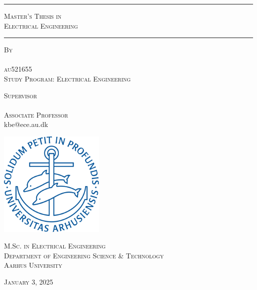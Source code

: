 \begin{titlepage}
    \centering
    \vspace*{-0.8cm}
    
    \rule{\linewidth}{0.3mm} %
    \vspace{1pt}
    {\LARGE\bfseries \ThesisTitle \par}
    \vspace{0.3cm}

    {\small\textsc{Master’s Thesis in\\
    Electrical Engineering}\par}

    \vspace{1pt}
    \rule{\linewidth}{0.3mm} %
    \vspace{0.2cm}
    
    {\small \textsc{By}\\[0.5cm]
    \normalsize \textbf{\AuthorName}\\
    \small \textsc{au521655\\
    Study Program: Electrical Engineering}\par} %
    \vspace{1cm}
    
    {\small \textsc{Supervisor}\\
    \normalsize \textbf{\SupervisorName}\\
    \small \textsc{Associate Professor}\\
    kbe@ece.au.dk\par}
    \vspace{1.5cm}

    
    \includegraphics[width=0.38\textwidth]{Logo/aulogoblue.png}\par
    \vspace{1.5cm}

    
    {\textsc{M.Sc. in Electrical Engineering\\
    Department of Engineering
    Science \& Technology\\
    Aarhus University}}\par
    \vspace{1cm}
    
    {\normalsize \textsc{January 3, 2025}}
\end{titlepage}
